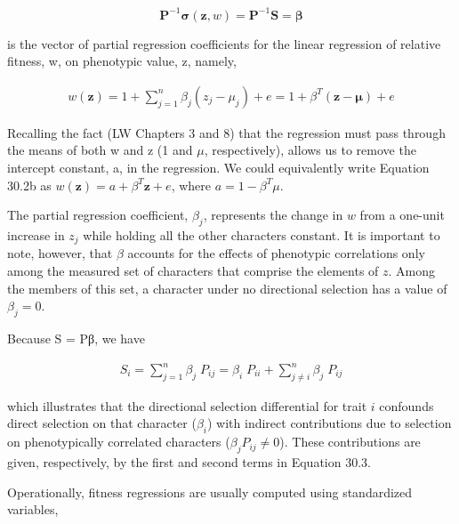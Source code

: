 \documentclass{article}
\begin{document}
\begin{equation}
\mathbf{P}^{-1}\boldsymbol{\sigma}(\mathbf{z},w)=\mathbf{P}^{-1}\mathbf{S}=\boldsymbol{\beta}
\tag{30.2a}
\label{eq:30_2a}
\end{equation}

is the vector of partial regression coefficients for the linear regression of relative fitness, w, on phenotypic value, z, namely,

\begin{equation}
\begin{align*}w(\mathbf{z})=1+\sum\limits_{j=1}^n\beta_j(z_j-\mu_j)+e=1+\beta^T(\mathbf{z}-\boldsymbol{\mu})+e\end{align*}
\tag{30.2b}
\label{eq:30_2b}
\end{equation}

Recalling the fact (LW Chapters 3 and 8) that the regression must pass through the means of both w and z (1 and  $ \mu $, respectively), allows us to remove the intercept constant, a, in the regression. We could equivalently write Equation 30.2b as  $ w(\mathbf{z}) = a + \beta^{T}\mathbf{z} + e $, where  $ a = 1 - \beta^{T}\mu $.

The partial regression coefficient,  $ \beta_j $, represents the change in  $ w $ from a one-unit increase in  $ z_j $ while holding all the other characters constant. It is important to note, however, that  $ \beta $ accounts for the effects of phenotypic correlations only among the measured set of characters that comprise the elements of  $ z $. Among the members of this set, a character under no directional selection has a value of  $ \beta_j = 0 $.

Because S = Pβ, we have

\begin{equation}
\begin{align*}S_i=\sum\limits_{j=1}^n\beta_j\;P_{ij}=\beta_i\;P_{ii}+\sum\limits_{j\ne i}^n\beta_j\;P_{ij}\end{align*}
\tag{30.3}
\label{eq:30_3}
\end{equation}

which illustrates that the directional selection differential for trait $i$ confounds direct selection on that character ($\beta_i$) with indirect contributions due to selection on phenotypically correlated characters ($\beta_j P_{ij} \neq 0$). These contributions are given, respectively, by the first and second terms in Equation 30.3.

Operationally, fitness regressions are usually computed using standardized variables,
\end{document}
